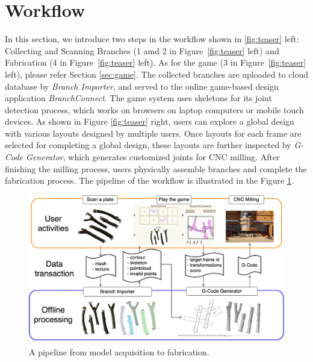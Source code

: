 \section{Workflow}
In this section, we introduce two steps in the workflow shown in \ref{fig:teaser} left: Collecting and Scanning Branches (1 amd 2 in Figure~\ref{fig:teaser} left) and Fabrication (4 in Figure~\ref{fig:teaser} left).
As for the game (3 in Figure~\ref{fig:teaser} left), please refer Section \ref{sec:game}.
The collected branches are uploaded to cloud database by \textit{Branch Importer}, and served to the online game-based design application \textit{BranchConnect}.
The game system uses skeletons for its joint detection process, which works on browsers on laptop computers or mobile touch devices.
As shown in Figure \ref{fig:teaser} right, users can explore a global design with various layouts designed by multiple users.
Once layouts for each frame are selected for completing a global design, these layouts are further inspected by \textit{G-Code Generator}, which generates customized joints for CNC milling.
After finishing the milling process, users physically assemble branches and complete the fabrication process.
The pipeline of the workflow is illustrated in the Figure \ref{fig:pipeline}.

\begin{figure}[ht]
  \begin{center}
    \includegraphics[width = 0.4\paperwidth]{images/workflow/pipeline.png}
    \caption{A pipeline from model acquisition to fabrication.}
    \label{fig:pipeline}
  \end{center}
\end{figure}

